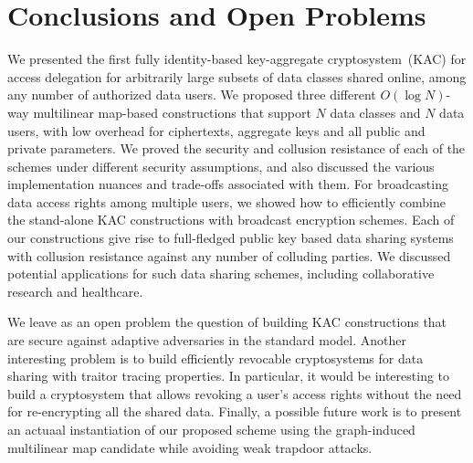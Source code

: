 \section{Conclusions and Open Problems}
\label{sec:conclusions}

We presented the first fully identity-based key-aggregate cryptosystem~(KAC) for access delegation for arbitrarily large subsets of data classes shared online, among any number of authorized data users. We proposed three different $O(\log N)$-way multilinear map-based constructions that support $N$ data classes and $N$ data users, with low overhead for ciphertexts, aggregate keys and all public and private parameters. We proved the security and collusion resistance of each of the schemes under different security assumptions, and also discussed the various implementation nuances and trade-offs associated with them. For broadcasting data access rights among multiple users, we showed how to efficiently combine the stand-alone KAC constructions with broadcast encryption schemes. Each of our constructions give rise to full-fledged public key based data sharing systems with collusion resistance against any number of colluding parties. We discussed potential applications for such data sharing schemes, including collaborative research and healthcare.

We leave as an open problem the question of building KAC constructions that are secure against adaptive adversaries in the standard model. Another interesting problem is to build efficiently revocable cryptosystems for data sharing with traitor tracing properties. In particular, it would be interesting to build a cryptosystem that allows revoking a user's access rights without the need for re-encrypting all the shared data. Finally, a possible future work is to present an actuaal instantiation of our proposed scheme using the graph-induced multilinear map candidate \cite{gentry2015graph} while avoiding weak trapdoor attacks. 